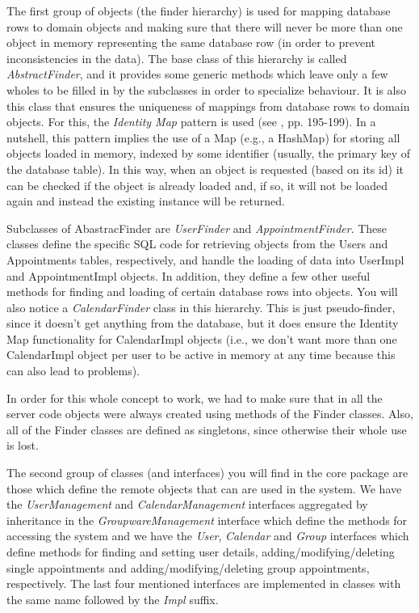 \documentclass[a4paper,10pt]{article}
\begin{document}
The first group of objects (the finder hierarchy) is used for mapping database rows to
domain objects and making sure that there will never be more than one object in memory
representing the same database row (in order to prevent inconsistencies in the data).
The base class of this hierarchy is called \textit{AbstractFinder}, and it provides some generic
methods which leave only a few wholes to be filled in by the subclasses in order to
specialize behaviour. It is also this class that ensures the uniqueness of mappings from
database rows to domain objects. For this, the \textit{Identity Map} pattern is used (see \cite{fow03},
pp. 195-199). In a nutshell, this pattern implies the use of a Map (e.g., a HashMap) for
storing all objects loaded in memory, indexed by some identifier (usually, the primary key
of the database table). In this way, when an object is requested (based on its id) it can be
checked if the object is already loaded and, if so, it will not be loaded again and instead the
existing instance will be returned.

Subclasses of AbastracFinder are \textit{UserFinder} and \textit{AppointmentFinder}. These
classes define the specific SQL code for retrieving objects from the Users and Appointments
tables, respectively, and handle the loading of data into UserImpl and AppointmentImpl
objects. In addition, they define a few other useful methods for finding and loading of certain
database rows into objects. You will also notice a \textit{CalendarFinder} class in this hierarchy.
This is just pseudo-finder, since it doesn't get anything from the database, but it does ensure
the Identity Map functionality for CalendarImpl objects (i.e., we don't want more than one
CalendarImpl object per user to be active in memory at any time because this can also lead
to problems).

In order for this whole concept to work, we had to make sure that in all the server code objects
were always created using methods of the Finder classes. Also, all of the Finder classes are
defined as singletons, since otherwise their whole use is lost.

The second group of classes (and interfaces) you will find in the core package are those which
define the remote objects that can are used in the system. We have the \textit{UserManagement}
and \textit{CalendarManagement} interfaces aggregated by inheritance in the \textit{GroupwareManagement}
interface which define the methods for accessing the system and we have the \textit{User},
\textit{Calendar} and \textit{Group} interfaces which define methods for finding and setting
user details, adding/modifying/deleting single appointments and adding/modifying/deleting
group appointments, respectively. The last four mentioned interfaces are implemented in
classes with the same name followed by the \textit{Impl} suffix.
\end{document}
